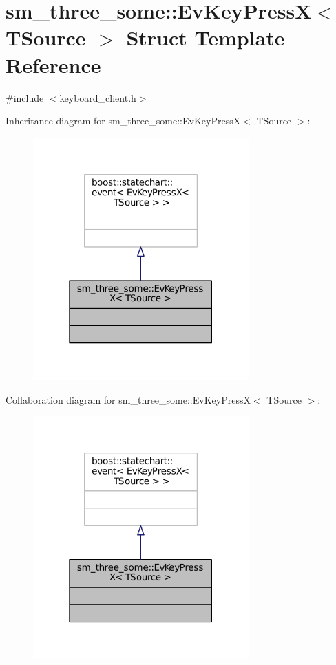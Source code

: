 \hypertarget{structsm__three__some_1_1EvKeyPressX}{}\section{sm\+\_\+three\+\_\+some\+:\+:Ev\+Key\+PressX$<$ T\+Source $>$ Struct Template Reference}
\label{structsm__three__some_1_1EvKeyPressX}


{\ttfamily \#include $<$keyboard\+\_\+client.\+h$>$}



Inheritance diagram for sm\+\_\+three\+\_\+some\+:\+:Ev\+Key\+PressX$<$ T\+Source $>$\+:
\nopagebreak
\begin{figure}[H]
\begin{center}
\leavevmode
\includegraphics[width=235pt]{structsm__three__some_1_1EvKeyPressX__inherit__graph}
\end{center}
\end{figure}


Collaboration diagram for sm\+\_\+three\+\_\+some\+:\+:Ev\+Key\+PressX$<$ T\+Source $>$\+:
\nopagebreak
\begin{figure}[H]
\begin{center}
\leavevmode
\includegraphics[width=235pt]{structsm__three__some_1_1EvKeyPressX__coll__graph}
\end{center}
\end{figure}



